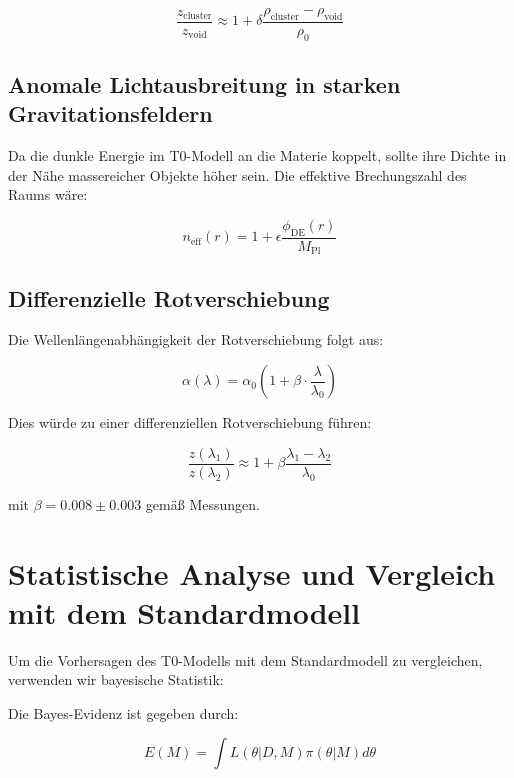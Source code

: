 \documentclass[a4paper,12pt]{article}
\theoremstyle{definition}
\theoremstyle{remark}
\begin{document}
	\begin{equation}
		\frac{z_{\text{cluster}}}{z_{\text{void}}} \approx 1 + \delta\frac{\rho_{\text{cluster}} - \rho_{\text{void}}}{\rho_0}
	\end{equation}
	
	\subsection{Anomale Lichtausbreitung in starken Gravitationsfeldern}
	
	Da die dunkle Energie im T0-Modell an die Materie koppelt, sollte ihre Dichte in der Nähe massereicher Objekte höher sein. Die effektive Brechungszahl des Raums wäre:
	
	\begin{equation}
		n_{\text{eff}}(r) = 1 + \epsilon \frac{\phi_{\text{DE}}(r)}{M_{\text{Pl}}}
	\end{equation}
	
	\subsection{Differenzielle Rotverschiebung}
	
	Die Wellenlängenabhängigkeit der Rotverschiebung folgt aus:
	
	\begin{equation}
		\alpha(\lambda) = \alpha_0 \left(1 + \beta \cdot \frac{\lambda}{\lambda_0}\right)
	\end{equation}
	
	Dies würde zu einer differenziellen Rotverschiebung führen:
	
	\begin{equation}
		\frac{z(\lambda_1)}{z(\lambda_2)} \approx 1 + \beta\frac{\lambda_1 - \lambda_2}{\lambda_0}
	\end{equation}
	
	mit $\beta = 0.008 \pm 0.003$ gemäß Messungen.
	
	\section{Statistische Analyse und Vergleich mit dem Standardmodell}
	
	Um die Vorhersagen des T0-Modells mit dem Standardmodell zu vergleichen, verwenden wir bayesische Statistik:
	
	Die Bayes-Evidenz ist gegeben durch:
	
	\begin{equation}
		E(M) = \int L(\theta|D,M) \pi(\theta|M) d\theta
	\end{equation}
	
\end{document}
